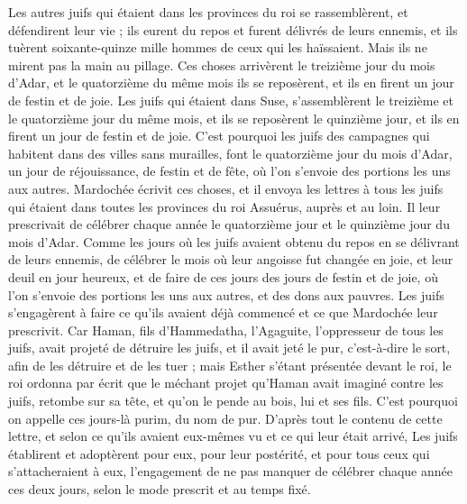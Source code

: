 \begin{multicols}{2}
Les autres juifs qui étaient dans les provinces du roi se rassemblèrent, et défendirent leur vie ; ils eurent du repos et furent délivrés de leurs ennemis, et ils tuèrent soixante-quinze mille hommes de ceux qui les haïssaient. Mais ils ne mirent pas la main au pillage.
Ces choses arrivèrent le treizième jour du mois d'Adar, et le quatorzième du même mois ils se reposèrent, et ils en firent un jour de festin et de joie.
Les juifs qui étaient dans Suse, s'assemblèrent le treizième et le quatorzième jour du même mois, et ils se reposèrent le quinzième jour, et ils en firent un jour de festin et de joie.
C'est pourquoi les juifs des campagnes qui habitent dans des villes sans murailles, font le quatorzième jour du mois d'Adar, un jour de réjouissance, de festin et de fête, où l’on s’envoie des portions les uns aux autres.
Mardochée écrivit ces choses, et il envoya les lettres à tous les juifs qui étaient dans toutes les provinces du roi Assuérus, auprès et au loin.
Il leur prescrivait de célébrer chaque année le quatorzième jour et le quinzième jour du mois d'Adar.
Comme les jours où les juifs avaient obtenu du repos en se délivrant de leurs ennemis, de célébrer le mois où leur angoisse fut changée en joie, et leur deuil en jour heureux, et de faire de ces jours des jours de festin et de joie, où l’on s’envoie des portions les uns aux autres, et des dons aux pauvres.
Les juifs s’engagèrent à faire ce qu’ils avaient déjà commencé et ce que Mardochée leur prescrivit.
Car Haman, fils d'Hammedatha, l’Agaguite, l'oppresseur de tous les juifs, avait projeté de détruire les juifs, et il avait jeté le pur, c'est-à-dire le sort, afin de les détruire et de les tuer ;
mais Esther s’étant présentée devant le roi, le roi ordonna par écrit que le méchant projet qu'Haman avait imaginé contre les juifs, retombe sur sa tête, et qu'on le pende au bois, lui et ses fils.
C'est pourquoi on appelle ces jours-là purim, du nom de pur. D’après tout le contenu de cette lettre, et selon ce qu’ils avaient eux-mêmes vu et ce qui leur était arrivé,
Les juifs établirent et adoptèrent pour eux, pour leur postérité, et pour tous ceux qui s’attacheraient à eux, l’engagement de ne pas manquer de célébrer chaque année ces deux jours, selon le mode prescrit et au temps fixé.

\end{multicols}
